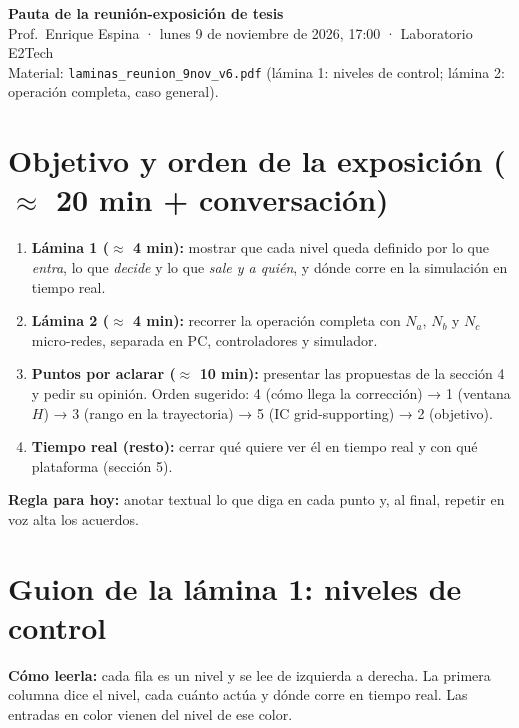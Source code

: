 \documentclass[10pt,a4paper]{article}
\begin{document}
{\Large\bfseries\color{usachT} Pauta de la reunión-exposición de tesis}\\[2pt]
Prof.\ Enrique Espina · lunes 9 de noviembre de 2026, 17:00 · Laboratorio E2Tech\\
Material: \texttt{laminas\_reunion\_9nov\_v6.pdf} (lámina 1: niveles de control; lámina 2: operación completa, caso general).

\section{Objetivo y orden de la exposición ($\approx$ 20 min + conversación)}
\begin{enumerate}
  \item \textbf{Lámina 1 ($\approx$ 4 min):} mostrar que cada nivel queda definido por lo que \emph{entra}, lo que \emph{decide} y lo que \emph{sale y a quién}, y dónde corre en la simulación en tiempo real.
  \item \textbf{Lámina 2 ($\approx$ 4 min):} recorrer la operación completa con $N_a$, $N_b$ y $N_c$ micro-redes, separada en PC, controladores y simulador.
  \item \textbf{Puntos por aclarar ($\approx$ 10 min):} presentar las propuestas de la sección 4 y pedir su opinión. Orden sugerido: 4 (cómo llega la corrección) → 1 (ventana $H$) → 3 (rango en la trayectoria) → 5 (IC grid-supporting) → 2 (objetivo).
  \item \textbf{Tiempo real (resto):} cerrar qué quiere ver él en tiempo real y con qué plataforma (sección 5).
\end{enumerate}
\textbf{Regla para hoy:} anotar textual lo que diga en cada punto y, al final, repetir en voz alta los acuerdos.

\section{Guion de la lámina 1: niveles de control}
\textbf{Cómo leerla:} cada fila es un nivel y se lee de izquierda a derecha. La primera columna dice el nivel, cada cuánto actúa y dónde corre en tiempo real. Las entradas en color vienen del nivel de ese color.
\end{document}
